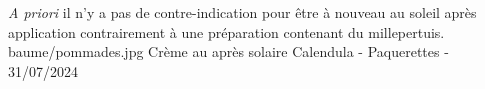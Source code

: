 {%
    \textit{A priori} il n'y a pas de contre-indication pour être à nouveau au soleil après application contrairement à une préparation contenant du millepertuis.
}
{%
    baume/pommades.jpg
}
{%
    Crème au après solaire
}
{%
    Calendula - Paquerettes - 31/07/2024
}